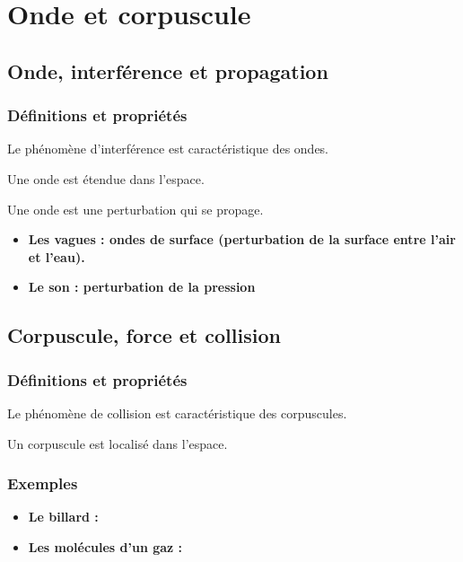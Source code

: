 \chapter{Onde et corpuscule}

\section{Onde, interférence et propagation}
\subsection{Définitions et propriétés}
Le phénomène d'interférence est caractéristique des ondes.
\begin{center}
Une onde est étendue dans l'espace.
\end{center}
\begin{center}
Une onde est une perturbation qui se propage.
\end{center}

\begin{itemize}[leftmargin=1cm, label=, itemsep=1pt]
\item {\bf Les vagues : ondes de surface (perturbation de la surface entre l'air et l'eau).}
\item {\bf Le son : perturbation de la pression}
\end{itemize}

\section{Corpuscule, force et collision}
\subsection{Définitions et propriétés}
Le phénomène de collision est caractéristique des corpuscules.
\begin{center}
Un corpuscule est localisé dans l'espace.
\end{center}
\subsection{Exemples}
\begin{itemize}[leftmargin=1cm, label=, itemsep=1pt]
\item {\bf Le billard : }
\item {\bf Les molécules d'un gaz : }
\end{itemize}



